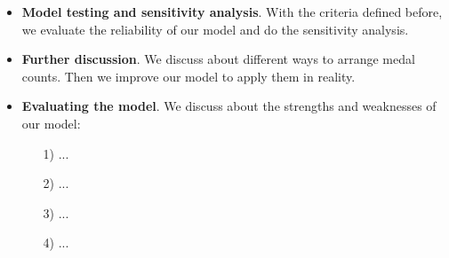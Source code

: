 \begin{itemize}
\item {\bf Model testing and sensitivity analysis}. With the criteria defined before, we evaluate the reliability of our model and do the sensitivity analysis.

\item {\bf Further discussion}. We discuss about different ways to arrange medal counts. Then we improve our model to apply them in reality.

\item {\bf Evaluating the model}. We discuss about the strengths and weaknesses of our model:

\begin{itemize}
\item[1)] ... 
\item[2)] ...
\item[3)] ...
\item[4)] ...
\end{itemize}

\end{itemize}
